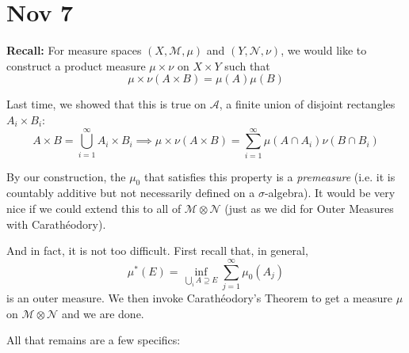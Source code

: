 \documentclass[12pt]{report}
\newcommand{\A}{\mathcal{A}}
\newcommand{\M}{\mathcal{M}}
\newcommand{\Nc}{\mathcal{N}}
\newcommand*{\tbf}[1]{\ifmmode\mathbf{#1}\else\textbf{#1}\fi}
\begin{document}
\section*{Nov 7}
    \tbf{Recall:} For measure spaces $(X, \M, \mu)$ and $(Y, \Nc, \nu)$, we would like to construct a product measure $\mu \times \nu$ on $X \times Y$ such that
    \[\mu\times\nu(A \times B) = \mu(A)\mu(B)\]

    Last time, we showed that this is true on $\A$, a finite union of disjoint rectangles $A_i \times B_i$: 
    \[A \times B = \bigcup_{i=1}^\infty A_i \times B_i \implies \mu\times\nu(A \times B) = \sum_{i=1}^\infty \mu(A \cap A_i) \nu(B \cap B_i)\]

    By our construction, the $\mu_0$ that satisfies this property is a \emph{premeasure} (i.e. it is countably additive but not necessarily defined on a $\sigma$-algebra). It would be very nice if we could extend this to all of $\M \otimes \Nc$ (just as we did for Outer Measures with Carathéodory).

    And in fact, it is not too difficult. First recall that, in general,
    \[\mu^*(E) = \inf_{\bigcup_i A \supseteq E} \sum_{j=1}^\infty \mu_0(A_j)\]
    is an outer measure. We then invoke Carathéodory's Theorem to get a measure $\mu$ on $\M \otimes \Nc$ and we are done.

    All that remains are a few specifics:
\end{document}
